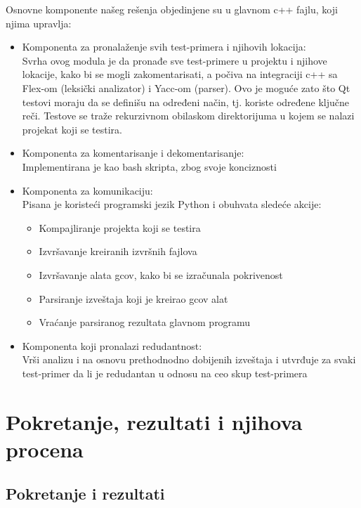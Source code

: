 \documentclass[a4paper]{article}
\theoremstyle{definition}
\begin{document}
Osnovne komponente našeg rešenja objedinjene su u glavnom c++ fajlu, koji njima upravlja:
\begin{itemize}
    \item Komponenta za pronalaženje svih test-primera i njihovih lokacija:\\
            Svrha ovog modula je da pronađe sve test-primere u projektu i njihove lokacije, kako bi se mogli zakomentarisati, a počiva na integraciji c++ sa Flex-om (leksički analizator) i Yacc-om (parser). Ovo je moguće zato što Qt testovi moraju da se definišu na određeni način, tj. koriste određene ključne reči. Testove se traže rekurzivnom obilaskom direktorijuma u kojem se nalazi projekat koji se testira.
    \item Komponenta za komentarisanje i dekomentarisanje:\\
            Implementirana je kao bash skripta, zbog svoje konciznosti
    \item Komponenta za komunikaciju:\\
            Pisana je koristeći programski jezik Python i obuhvata sledeće akcije:
            \begin{itemize}
                \item Kompajliranje projekta koji se testira
                \item Izvršavanje kreiranih izvršnih fajlova
                \item Izvršavanje alata gcov, kako bi se izračunala pokrivenost
                \item Parsiranje izveštaja koji je kreirao gcov alat
                \item Vraćanje parsiranog rezultata glavnom programu
            \end{itemize}
    \item Komponenta koji pronalazi redudantnost:\\
            Vrši analizu i na osnovu prethodnodno dobijenih izveštaja i utvrđuje za svaki test-primer da li je redudantan u odnosu na ceo skup test-primera
\end{itemize}

\section{Pokretanje, rezultati i njihova procena}
\label{sec:pokretanje_rezultati_procena}

\subsection{Pokretanje i rezultati}
\label{subsec:pokretanje_rezultati}
\end{document}
